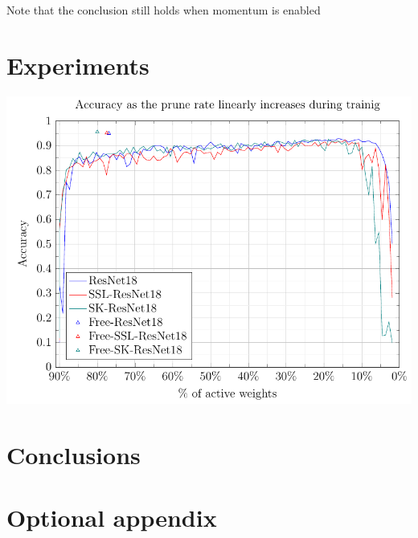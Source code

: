 \documentclass[12pt]{report}
\begin{document}
    Note that the conclusion still holds when momentum is enabled
    \chapter{Experiments}

    \includegraphics[width=1.0\textwidth]{plots/variant_sparsity.pdf}

%
%
%
%
%
%
%


    \chapter{Conclusions}


    \appendix


    \chapter{Optional appendix}

    \printbibliography
\end{document}

